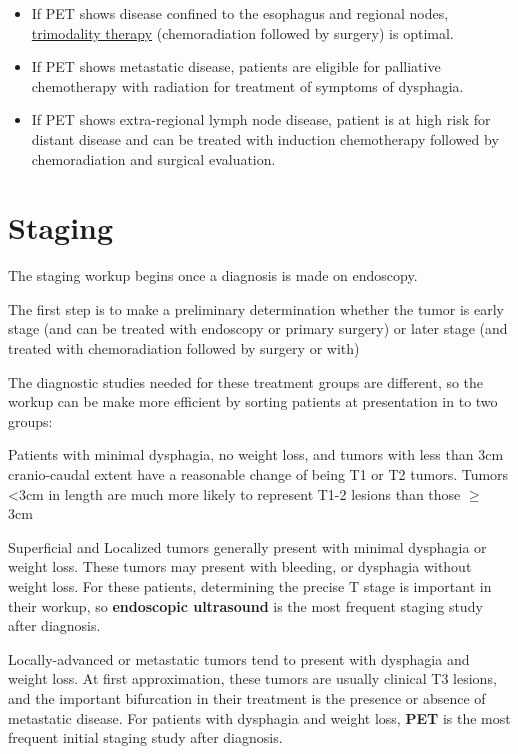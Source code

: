 \documentclass[
]{book}
\providecommand{\tightlist}{%
  \setlength{\itemsep}{0pt}\setlength{\parskip}{0pt}}
\begin{document}
\begin{itemize}
\tightlist
\item
  If PET shows disease confined to the esophagus and regional nodes, \protect\hyperlink{trimodality}{trimodality therapy} (chemoradiation followed by surgery) is optimal.
\item
  If PET shows metastatic disease, patients are eligible for palliative chemotherapy with radiation for treatment of symptoms of dysphagia.
\item
  If PET shows extra-regional lymph node disease, patient is at high risk for distant disease and can be treated with induction chemotherapy followed by chemoradiation and surgical evaluation.
\end{itemize}

\hypertarget{staging}{%
\chapter{Staging}\label{staging}}

The staging workup begins once a diagnosis is made on endoscopy.

The first step is to make a preliminary determination whether the tumor is early stage (and can be treated with endoscopy or primary surgery) or later stage (and treated with chemoradiation followed by surgery or with)

The diagnostic studies needed for these treatment groups are different, so the workup can be make more efficient by sorting patients at presentation in to two groups:

Patients with minimal dysphagia, no weight loss, and tumors with less than 3cm cranio-caudal extent have a reasonable change of being T1 or T2 tumors. Tumors \textless3cm in length are much more likely to represent T1-2 lesions than those \(\geq\) 3cm\citep{hollis1114}

Superficial and Localized tumors generally present with minimal dysphagia or weight loss. These tumors may present with bleeding, or dysphagia without weight loss. For these patients, determining the precise T stage is important in their workup, so \textbf{endoscopic ultrasound} is the most frequent staging study after diagnosis.

Locally-advanced or metastatic tumors tend to present with dysphagia and weight loss. At first approximation, these tumors are usually clinical T3 lesions, and the important bifurcation in their treatment is the presence or absence of metastatic disease. For patients with dysphagia and weight loss, \textbf{PET} is the most frequent initial staging study after diagnosis.
\end{document}
